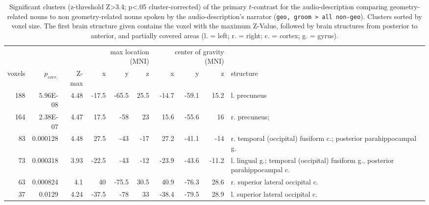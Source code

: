 \documentclass[english]{article}
\begin{document}
\begin{table}[t]
    \caption{Significant clusters (z-threshold Z>3.4; p<.05 cluster-corrected)
        of the primary $t$-contrast for the audio-description comparing
        geometry-related nouns to non geometry-related nouns spoken by the
        audio-description's narrator (\texttt{geo, groom > all non-geo}).
        Clusters sorted by voxel size.
    The first brain structure given contains the voxel with the maximum Z-Value,
followed by brain structures from posterior to anterior, and partially covered
areas (l. = left; r. = right; c. = cortex; g. = gyrus).}
    \label{tab:res-ao-group1}
\begin{tabular}{rrrrrrrrrp{3cm}}
\toprule
& & & \multicolumn{3}{r}{max location (MNI)} & \multicolumn{3}{r}{center of gravity (MNI)} &
\\ \cmidrule{4-6} \cmidrule{7-9}
voxels & $p_{corr.}$ & Z-max & x & y & z  & x & y & z & structure \\
\midrule
188 & 5.96E-08 & 4.48 & -17.5 & -65.5 & 25.5 & -14.7 & -59.1 & 15.2 & l. precuneus \\
164 & 2.38E-07 & 4.47 & 17.5 & -58 & 23 & 15.6 & -55.6 & 16 & r. precuneus; \\
83 & 0.000128 & 4.48 & 27.5 & -43 & -17 & 27.2 & -41.1 & -14 & r. temporal (occipital) fusiform c.; posterior parahippocampal g. \\
73 & 0.000318 & 3.93 & -22.5 & -43 & -12 & -23.9 & -43.6 & -11.2 & l. lingual g.; temporal (occipital) fusiform g., posterior parahippocampal c. \\
63 & 0.000824 & 4.1 & 40 & -75.5 & 30.5 & 40.9 & -76.3 & 28.6 & r. superior lateral occipital c. \\
37 & 0.0129 & 4.24 & -37.5 & -78 & 33 & -38.4 & -79.5 & 28.9 & l. superior lateral occipital c. \\
\bottomrule
\end{tabular}
\end{table}
\end{document}
